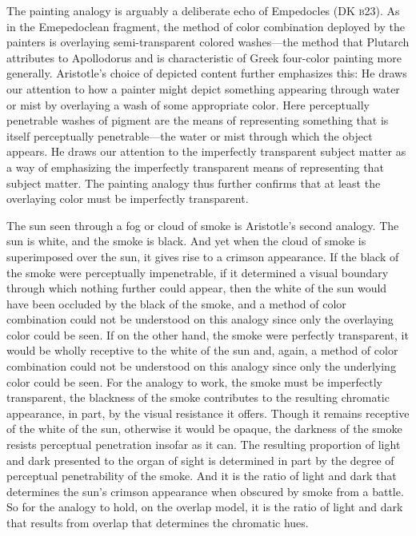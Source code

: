 The painting analogy is arguably a deliberate echo of Empedocles (DK \textsc{b}23). As in the Emepedoclean fragment, the method of color combination deployed by the painters is overlaying semi-transparent colored washes---the method that Plutarch attributes to Apollodorus and is characteristic of Greek four-color painting more generally. Aristotle's choice of depicted content further emphasizes this: He draws our attention to how a painter might depict something appearing through water or mist by overlaying a wash of some appropriate color. Here perceptually penetrable washes of pigment are the means of representing something that is itself perceptually penetrable---the water or mist through which the object appears. He draws our attention to the imperfectly transparent subject matter as a way of emphasizing the imperfectly transparent means of representing that subject matter. The painting analogy thus further confirms that at least the overlaying color must be imperfectly transparent.

The sun seen through a fog or cloud of smoke is Aristotle's second analogy. The sun is white, and the smoke is black. And yet when the cloud of smoke is superimposed over the sun, it gives rise to a crimson appearance. If the black of the smoke were perceptually impenetrable, if it determined a visual boundary through which nothing further could appear, then the white of the sun would have been occluded by the black of the smoke, and a method of color combination could not be understood on this analogy since only the overlaying color could be seen. If on the other hand, the smoke were perfectly transparent, it would be wholly receptive to the white of the sun and, again, a method of color combination could not be understood on this analogy since only the underlying color could be seen. For the analogy to work, the smoke must be imperfectly transparent, the blackness of the smoke contributes to the resulting chromatic appearance, in part, by the visual resistance it offers. Though it remains receptive of the white of the sun, otherwise it would be opaque, the darkness of the smoke resists perceptual penetration insofar as it can. The resulting proportion of light and dark presented to the organ of sight is determined in part by the degree of perceptual penetrability of the smoke. And it is the ratio of light and dark that determines the sun's crimson appearance when obscured by smoke from a battle. So for the analogy to hold, on the overlap model, it is the ratio of light and dark that results from overlap that determines the chromatic hues.

